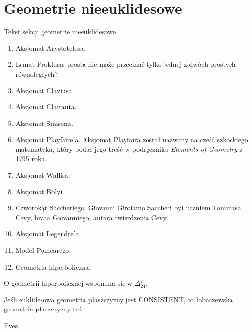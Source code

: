 %

\chapter{Geometrie nieeuklidesowe}
Tekst sekcji geometrie nieeuklidesowe.
\begin{enumerate}
	\item Aksjomat Arystotelesa. 
	\item Lemat Proklusa: prosta nie może przecinać tylko jednej z dwóch prostych równoległych? 
	\item Aksjomat Claviusa. 
	\item Aksjomat Clairauta. 
	\item Aksjomat Simsona. 
	\item Aksjomat Playfaire'a. 
	Aksjomat Playfaira został nazwany na cześć szkockiego matematyka, który podał jego treść w podręczniku \emph{Elements of Geometry} z 1795 roku.
%
	\item Aksjomat Wallisa. 
	\item Aksjomat Bolyi. 
	\item Czworokąt Saccheriego. %
	Giovanni Girolamo Saccheri był uczniem Tommasa Cevy, brata Giovanniego, autora twierdzenia Cevy.
	\item Aksjomat Legendre'a. 
	\item Model Poincarego. 
	\item Geometria hiperboliczna. 
\end{enumerate}

O geometrii hiperbolicznej wspomina się w $\Delta_{24}^7$.

\begin{proposition}
	Jeśli euklidesowa geometria płaszczyzny jest CONSISTENT, to łobaczewska geometria płaszczyzny też.
\end{proposition}

Eves \cite[s. 347-353]{eves1_1972}.

%